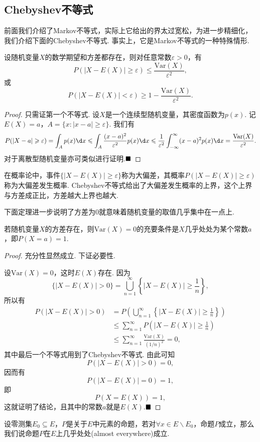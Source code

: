 \documentclass[lang=cn,10pt]{elegantbook}
\begin{document}
\subsection{Chebyshev不等式}
前面我们介绍了Markov不等式，实际上它给出的界太过宽松，为进一步精细化，我们介绍下面的Chebyshev不等式. 事实上，它是Markov不等式的一种特殊情形.
\begin{theorem}[Chebyshev不等式]
	设随机变量$X$的数学期望和方差都存在，则对任意常数$\varepsilon>0$，有
	$$P(|X-E(X)|\geqslant\varepsilon)\leqslant\frac{\mathrm{Var}(X)}{\varepsilon^2},$$
	或
	$$P(|X-E(X)|<\varepsilon)\geqslant 1-\frac{\mathrm{Var}(X)}{\varepsilon^2}.$$
\end{theorem}
\begin{proof}
	只需证第一个不等式. 设$X$是一个连续型随机变量，其密度函数为$p(x)$. 记$E(X)=a$，$A=\{x:|x-a|\geqslant\varepsilon\}$. 我们有
	$$P(|X-a|\geqslant\varepsilon)=\int_{A}p(x)\d x\leqslant\int_{A}\frac{(x-a)^2}{\varepsilon^2}p(x)\d x\leqslant\frac{1}{\varepsilon^2}\int_{-\infty}^{\infty}(x-a)^2p(x)\d x=\frac{\mathrm{Var}(X)}{\varepsilon^2}.$$
	对于离散型随机变量亦可类似进行证明.$\hfill\blacksquare$
\end{proof}
在概率论中，事件$\{|X-E(X)|\geqslant\varepsilon\}$称为{\heiti 大偏差}，其概率$P(|X-E(X)|\geqslant\varepsilon)$称为{\heiti 大偏差发生概率}. Chebyshev不等式给出了大偏差发生概率的上界，这个上界与方差成正比，方差越大上界也越大.

下面定理进一步说明了方差为$0$就意味着随机变量的取值几乎集中在一点上.
\begin{theorem}
	若随机变量$X$的方差存在，则$\mathrm{Var}(X)=0$的充要条件是$X$几乎处处为某个常数$a$，即$P(X=a)=1$.
\end{theorem}
\begin{proof}
	充分性显然成立. 下证必要性.
	
	设$\mathrm{Var}(X)=0$，这时$E(X)$存在. 因为
	$$\{|X-E(X)|>0\}=\bigcup_{n=1}^{\infty}\left\{|X-E(X)|\geqslant\frac{1}{n}\right\},$$
	所以有
	\begin{align*}
		P(|X-E(X)|>0)&=P\left(\bigcup_{n=1}^{\infty}\left\{|X-E(X)|\geqslant\frac{1}{n}\right\}\right)\\
		&\leqslant\sum_{n=1}^{\infty}P\left(|X-E(X)|\geqslant\frac{1}{n}\right)\\
		&\leqslant\sum_{n=1}^{\infty}\frac{\mathrm{Var}(X)}{(1/n)^2}=0,
	\end{align*}
	其中最后一个不等式用到了Chebyshev不等式. 由此可知
	$$P(|X-E(X)|>0)=0,$$
	因而有
	$$P(|X-E(X)|=0)=1,$$
	即
	$$P(X=E(X))=1,$$
	这就证明了结论，且其中的常数$a$就是$E(X)$.$\hfill\blacksquare$
\end{proof}
\begin{remark}
	设零测集$E_0\subseteq E$，$P$是关于$E$中元素的命题，若对$\forall x\in E\backslash E_0$，命题$P$成立，那么我们说命题$P$在$E$上{\heiti 几乎处处}(almost everywhere)成立.
\end{remark}
\end{document}
